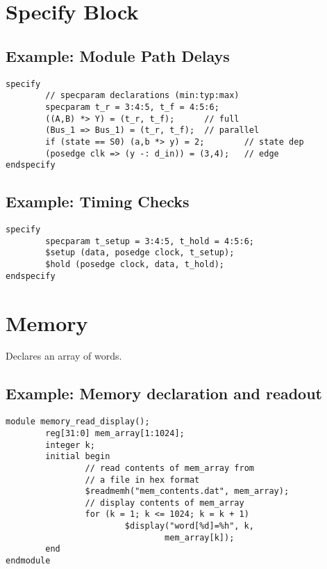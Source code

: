 \documentclass[10pt,twocolumn]{article}
\begin{document}
\section*{Specify Block}\vspace{-10pt}
\subsection*{Example: Module Path Delays}\vspace{-10pt}
\begin{lstlisting}
specify
        // specparam declarations (min:typ:max)
        specparam t_r = 3:4:5, t_f = 4:5:6;
        ((A,B) *> Y) = (t_r, t_f);      // full
        (Bus_1 => Bus_1) = (t_r, t_f);  // parallel
        if (state == S0) (a,b *> y) = 2;        // state dep
        (posedge clk => (y -: d_in)) = (3,4);   // edge
endspecify
\end{lstlisting}
\subsection*{Example: Timing Checks}\vspace{-10pt}
\begin{lstlisting}
specify
        specparam t_setup = 3:4:5, t_hold = 4:5:6;
        $setup (data, posedge clock, t_setup);
        $hold (posedge clock, data, t_hold);
endspecify
\end{lstlisting}
%
\section*{Memory}\vspace{-10pt}
Declares an array of words.
\subsection*{Example: Memory declaration and readout}\vspace{-10pt}
\begin{lstlisting}
module memory_read_display();
        reg[31:0] mem_array[1:1024];
        integer k;
        initial begin
                // read contents of mem_array from 
                // a file in hex format
                $readmemh("mem_contents.dat", mem_array);
                // display contents of mem_array
                for (k = 1; k <= 1024; k = k + 1)
                        $display("word[%d]=%h", k, 
                                mem_array[k]);
        end
endmodule
\end{lstlisting}
%
\end{document}
